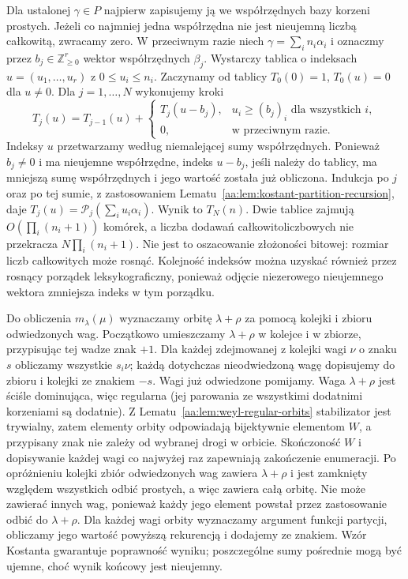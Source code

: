 Dla ustalonej $\gamma\in P$ najpierw zapisujemy ją we współrzędnych bazy korzeni prostych. Jeżeli co najmniej jedna współrzędna nie jest nieujemną liczbą całkowitą, zwracamy zero. W przeciwnym razie niech $\gamma=\sum_i n_i\alpha_i$ i oznaczmy przez $b_j\in\mathbb Z_{\ge0}^r$ wektor współrzędnych $\beta_j$. Wystarczy tablica o indeksach $u=(u_1,\ldots,u_r)$ z $0\le u_i\le n_i$. Zaczynamy od tablicy $T_0(0)=1$, $T_0(u)=0$ dla $u\ne0$. Dla $j=1,\ldots,N$ wykonujemy kroki
\[
 T_j(u)=T_{j-1}(u)+
 \begin{cases}
 T_j(u-b_j),&u_i\ge(b_j)_i\text{ dla wszystkich }i,\\
 0,&\text{w przeciwnym razie}.
 \end{cases}
\]
Indeksy $u$ przetwarzamy według niemalejącej sumy współrzędnych. Ponieważ $b_j\ne0$ i ma nieujemne współrzędne, indeks $u-b_j$, jeśli należy do tablicy, ma mniejszą sumę współrzędnych i jego wartość została już obliczona. Indukcja po $j$ oraz po tej sumie, z zastosowaniem Lematu~\ref{aa:lem:kostant-partition-recursion}, daje
$T_j(u)=\mathcal P_j(\sum_i u_i\alpha_i)$.
Wynik to $T_N(n)$. Dwie tablice zajmują $O(\prod_i(n_i+1))$ komórek, a liczba dodawań całkowitoliczbowych nie przekracza $N\prod_i(n_i+1)$. Nie jest to oszacowanie złożoności bitowej: rozmiar liczb całkowitych może rosnąć. Kolejność indeksów można uzyskać również przez rosnący porządek leksykograficzny, ponieważ odjęcie niezerowego nieujemnego wektora zmniejsza indeks w tym porządku.

Do obliczenia $m_\lambda(\mu)$ wyznaczamy orbitę $\lambda+\rho$ za pomocą kolejki i zbioru odwiedzonych wag. Początkowo umieszczamy $\lambda+\rho$ w kolejce i w zbiorze, przypisując tej wadze znak $+1$. Dla każdej zdejmowanej z kolejki wagi $\nu$ o znaku $s$ obliczamy wszystkie $s_i\nu$; każdą dotychczas nieodwiedzoną wagę dopisujemy do zbioru i kolejki ze znakiem $-s$. Wagi już odwiedzone pomijamy. Waga $\lambda+\rho$ jest ściśle dominująca, więc regularna (jej parowania ze wszystkimi dodatnimi korzeniami są dodatnie). Z Lematu~\ref{aa:lem:weyl-regular-orbits} stabilizator jest trywialny, zatem elementy orbity odpowiadają bijektywnie elementom $W$, a przypisany znak nie zależy od wybranej drogi w orbicie. Skończoność $W$ i dopisywanie każdej wagi co najwyżej raz zapewniają zakończenie enumeracji. Po opróżnieniu kolejki zbiór odwiedzonych wag zawiera $\lambda+\rho$ i jest zamknięty względem wszystkich odbić prostych, a więc zawiera całą orbitę. Nie może zawierać innych wag, ponieważ każdy jego element powstał przez zastosowanie odbić do $\lambda+\rho$. Dla każdej wagi orbity wyznaczamy argument funkcji partycji, obliczamy jego wartość powyższą rekurencją i dodajemy ze znakiem. Wzór Kostanta gwarantuje poprawność wyniku; poszczególne sumy pośrednie mogą być ujemne, choć wynik końcowy jest nieujemny.

